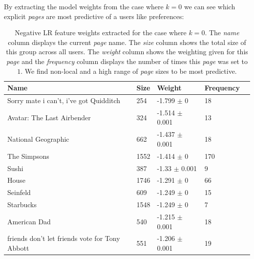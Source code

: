 By extracting the model weights from the case where $k=0$ we can see which explicit \emph{pages} are most predictive of a users like preferences:
\begin{table}[h]
\begin{minipage}[b]{1.0\textwidth}
\centering
  \begin{tabular}{|l|l|l|l|l|} %
  \hline
  \textbf{Name} & \textbf{Size} & \textbf{Weight} & \textbf{Frequency} \\ \hline
\small{Sorry mate i can't, i've got Quidditch}  & 254 & -1.799 $\pm$ 0 & 18 \\ \hline
\small{Avatar: The Last Airbender}  & 324 & -1.514 $\pm$ 0.001 & 13 \\ \hline
\small{National Geographic}  & 662 & -1.437 $\pm$ 0.001 & 18 \\ \hline
\small{The Simpsons}  & 1552 & -1.414 $\pm$ 0 & 170 \\ \hline
\small{Sushi}  & 387 & -1.33 $\pm$ 0.001 & 9 \\ \hline
\small{House}  & 1746 & -1.291 $\pm$ 0 & 66 \\ \hline
\small{Seinfeld}  & 609 & -1.249 $\pm$ 0 & 15 \\ \hline
\small{Starbucks}  & 1548 & -1.249 $\pm$ 0 & 7 \\ \hline
\small{American Dad}  & 540 & -1.215 $\pm$ 0.001 & 18 \\ \hline
\small{friends don't let friends vote for Tony Abbott}  & 551 & -1.206 $\pm$ 0.001 & 19 \\ \hline
  \end{tabular}
 \caption{Negative LR feature weights extracted for the case where $k=0$. The \emph{name} column displays the current \emph{page} name.
  The \emph{size} column shows the total size of this group across all users.
  The \emph{weight} column shows the weighting given for this \emph{page} and the \emph{frequency} column displays the number of times 
  this \emph{page} was set to $1$. We find non-local and a high range of \emph{page} sizes to be most predictive.}
\end{minipage}
\end{table}

